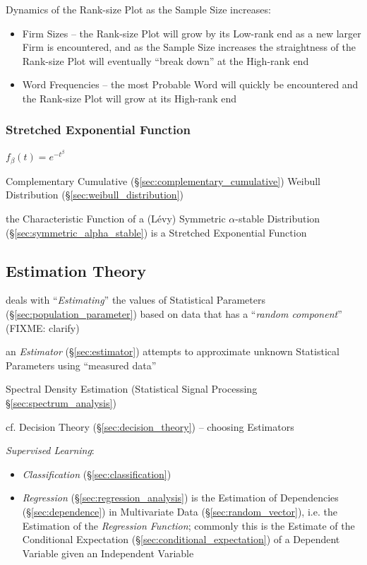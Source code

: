 Dynamics of the Rank-size Plot as the Sample Size increases:
\begin{itemize}
  \item Firm Sizes -- the Rank-size Plot will grow by its Low-rank end as a new
    larger Firm is encountered, and as the Sample Size increases the
    straightness of the Rank-size Plot will eventually ``break down'' at the
    High-rank end
  \item Word Frequencies -- the most Probable Word will quickly be encountered
    and the Rank-size Plot will grow at its High-rank end
\end{itemize}



\subsubsection{Stretched Exponential Function}\label{sec:stretched_exponential}

$f_\beta(t) = e^{-t^\beta}$

Complementary Cumulative (\S\ref{sec:complementary_cumulative}) Weibull
Distribution (\S\ref{sec:weibull_distribution})

the Characteristic Function of a (L\'evy) Symmetric $\alpha$-stable Distribution
(\S\ref{sec:symmetric_alpha_stable}) is a Stretched Exponential Function



\subsection{Estimation Theory}\label{sec:estimation_theory}

deals with ``\emph{Estimating}'' the values of Statistical Parameters
(\S\ref{sec:population_parameter}) based on data that has a ``\emph{random
  component}'' (FIXME: clarify)

an \emph{Estimator} (\S\ref{sec:estimator}) attempts to approximate unknown
Statistical Parameters using ``measured data''

\fist Spectral Density Estimation (Statistical Signal Processing
\S\ref{sec:spectrum_analysis})

\fist cf. Decision Theory (\S\ref{sec:decision_theory}) -- choosing Estimators

\fist \emph{Supervised Learning}:
\begin{itemize}
  \item \emph{Classification} (\S\ref{sec:classification})
  \item \emph{Regression} (\S\ref{sec:regression_analysis}) is the Estimation of
    Dependencies (\S\ref{sec:dependence}) in Multivariate Data
    (\S\ref{sec:random_vector}), i.e. the Estimation of the \emph{Regression
      Function}; commonly this is the Estimate of the Conditional Expectation
    (\S\ref{sec:conditional_expectation}) of a Dependent Variable given an
    Independent Variable
\end{itemize}

